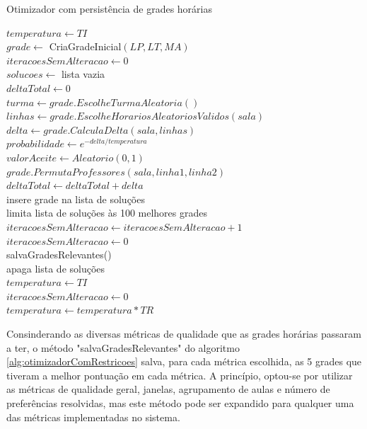 \begin{algorithm}
	\caption{Otimizador com persistência de grades horárias}
	\label{alg:otimizadorComRestricoes}
	$temperatura \leftarrow TI$\\
	$grade \leftarrow$ CriaGradeInicial$(LP, LT, MA)$\\
	$iteracoesSemAlteracao \leftarrow 0$\\
	$solucoes \leftarrow$ lista vazia\\
	 {
		$deltaTotal \leftarrow 0$\\
		 {
			$turma \leftarrow grade.EscolheTurmaAleatoria()$\\
			$linhas \leftarrow grade.EscolheHorariosAleatoriosValidos(sala)$\\
			$delta \leftarrow grade.CalculaDelta(sala, linhas)$\\
			$probabilidade \leftarrow e^{-delta/temperatura}$\\
			$valorAceite \leftarrow Aleatorio(0, 1)$\\
			 {
				$grade.PermutaProfessores(sala, linha1, linha2)$\\
				$deltaTotal \leftarrow deltaTotal + delta$\\
				 {
					insere grade na lista de soluções\\
					limita lista de soluções às 100 melhores grades\\
				}
			}
		}
		 {
			$iteracoesSemAlteracao \leftarrow iteracoesSemAlteracao + 1$\\
		}{
			$iteracoesSemAlteracao \leftarrow 0$\\
		}
		 {
			salvaGradesRelevantes()\\
			apaga lista de soluções\\
			$temperatura \leftarrow TI$\\
			$iteracoesSemAlteracao \leftarrow 0$\\
		}
		$temperatura \leftarrow temperatura * TR$
	}
\end{algorithm}
\pagebreak

Consinderando as diversas métricas de qualidade que as grades horárias passaram a ter, o método "salvaGradesRelevantes" do algoritmo \ref{alg:otimizadorComRestricoes} salva, para cada métrica escolhida, as 5 grades que tiveram a melhor pontuação em cada métrica. A princípio, optou-se por utilizar as métricas de qualidade geral, janelas, agrupamento de aulas e número de preferências resolvidas, mas este método pode ser expandido para qualquer uma das métricas implementadas no sistema.

